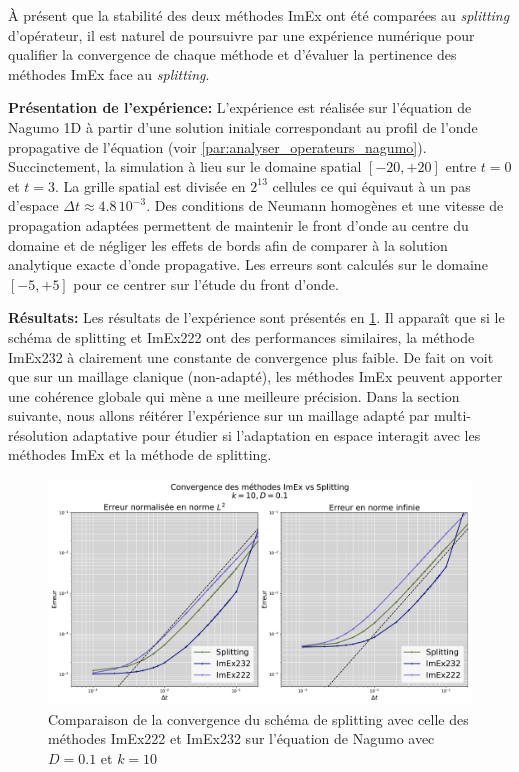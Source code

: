 À présent que la stabilité des deux méthodes ImEx ont été comparées au \textit{splitting} d'opérateur, 
il est naturel de poursuivre par une expérience numérique pour qualifier la convergence de chaque méthode et 
d'évaluer la pertinence des méthodes ImEx face au \textit{splitting}.\par
\textbf{Présentation de l'expérience: }
    L'expérience est réalisée sur l'équation de Nagumo 1D à partir d'une solution initiale correspondant au profil de l'onde propagative de l'équation (voir \ref{par:analyser_operateurs_nagumo}).
    Succinctement, la simulation à lieu sur le domaine spatial $[-20,+20]$ entre $t=0$ et $t=3$.
    La grille spatial est divisée en $2^{13}$ cellules ce qui équivaut à un pas d'espace $\Delta t \approx 4.8 \, 10^{-3}$.
    Des conditions de Neumann homogènes et une vitesse de propagation adaptées permettent de maintenir le front d'onde au centre du domaine et 
    de négliger les effets de bords afin de comparer à la solution analytique exacte d'onde propagative. Les erreurs sont calculés sur le domaine $[-5,+5]$ pour ce centrer sur l'étude du front d'onde.\par
\textbf{Résultats: }
    Les résultats de l'expérience sont présentés en \ref{fig:imex_vs_splitting}. Il apparaît que si le schéma de splitting et ImEx222 ont des performances similaires, la méthode ImEx232
    à clairement une constante de convergence plus faible. De fait on voit que sur un maillage clanique (non-adapté), les méthodes ImEx peuvent apporter une cohérence globale qui mène a 
    une meilleure précision. Dans la section suivante, nous allons réitérer l'expérience sur un maillage adapté par multi-résolution adaptative pour étudier si l'adaptation en espace 
    interagit avec les méthodes ImEx et la méthode de splitting.
    \begin{figure}[hb!]
        \centering
        \includegraphics[width=\linewidth]{media/4_travail/2_nagumo/convergence/ImEx_vs_splitting_k10_D0.1.pdf}
    \caption{Comparaison de la convergence du schéma de splitting avec celle des méthodes ImEx222 et ImEx232
    sur l'équation de Nagumo avec $D=0.1$ et $k=10$}
    \label{fig:imex_vs_splitting}
    \end{figure}
\newpage
